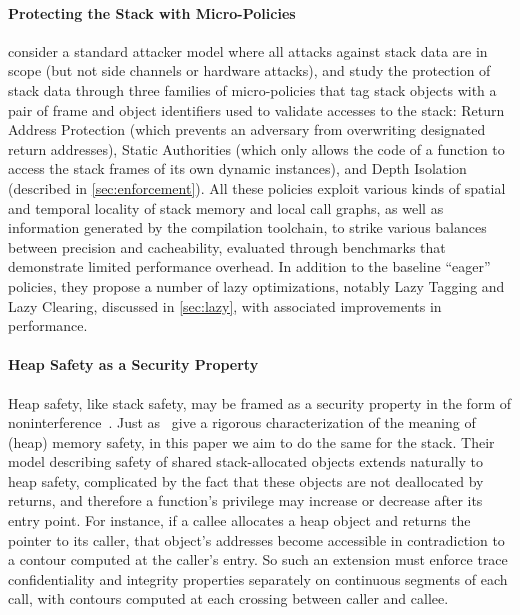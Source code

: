 \documentclass[acmsmall,review,anonymous]{acmart}\settopmatter{printfolios=true,printccs=false,printacmref=false}
\begin{document}
\paragraph{Protecting the Stack with Micro-Policies}
%
\citet{DBLP:conf/sp/RoesslerD18} consider a standard attacker model where all
attacks against stack data are in scope (but not side channels or hardware
attacks), and study the protection of stack data through three families of
micro-policies that tag stack objects with a pair of frame and object identifiers
used to validate accesses to the stack: Return Address Protection (which
prevents an adversary from overwriting designated return addresses), Static
Authorities (which only allows the code of a function to access the stack frames
of its own dynamic instances), and Depth Isolation (described in
\cref{sec:enforcement}). All these policies exploit various kinds of spatial and
temporal locality of stack memory and local call graphs, as well as information
generated by the compilation toolchain, to strike various balances between
precision and cacheability, evaluated through benchmarks that demonstrate
limited performance overhead. In addition to the baseline ``eager'' policies,
they propose a number of lazy optimizations, notably Lazy Tagging and Lazy
Clearing, discussed in \cref{sec:lazy}, with associated improvements in
performance.

\paragraph{Heap Safety as a Security Property}

Heap safety, like stack safety, may be framed as a security property
in the form of
noninterference~\citep{DBLP:conf/post/AmorimHP18}\ifaftersubmission{}\fi. Just
as~\citeauthor{DBLP:conf/post/AmorimHP18} give a rigorous
characterization of the meaning of (heap) memory safety, in this paper
we aim to do the same for the stack.
%
Their model describing safety of shared stack-allocated
objects extends naturally to heap safety, complicated by the fact that
these objects are not deallocated by returns, and therefore a
function's privilege may increase or decrease after its entry
point. For instance, if a callee allocates a heap object and returns
the pointer to its caller, that object's addresses become accessible
in contradiction to a contour computed at the caller's entry. So such
an extension must enforce trace confidentiality and integrity
properties separately on continuous segments of each call, with
contours computed at each crossing between caller and callee.  
\end{document}

